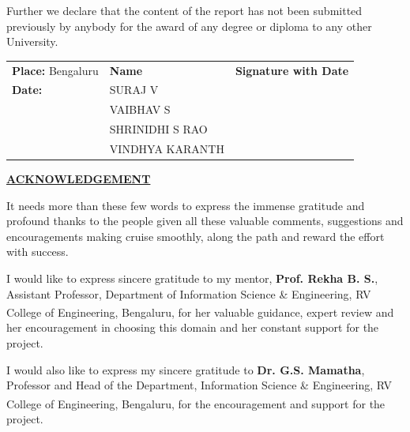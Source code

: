 \documentclass[12pt,a4paper]{report}
\begin{document}
\vspace{0.5cm}

Further we declare that the content of the report has not been submitted previously by anybody for the award of any degree or diploma to any other University.

\vfill

\begin{tabular}{@{}p{4cm}p{6cm}p{4cm}@{}}
\textbf{Place:} Bengaluru & \textbf{Name} & \textbf{Signature with Date} \\[0.5cm]
\textbf{Date:} & SURAJ V & \\[0.5cm]
& VAIBHAV S & \\[0.5cm]
& SHRINIDHI S RAO & \\[0.5cm]
& VINDHYA KARANTH & \\
\end{tabular}

\newpage
\pagestyle{frontmatter}

\begin{center}
{\Large \textbf{\underline{ACKNOWLEDGEMENT}}}
\end{center}

\vspace{1cm}

It needs more than these few words to express the immense gratitude and profound thanks to the people given all these valuable comments, suggestions and encouragements making cruise smoothly, along the path and reward the effort with success.

\vspace{0.5cm}

I would like to express sincere gratitude to my mentor, \textbf{Prof. Rekha B. S.}, Assistant Professor, Department of Information Science \& Engineering, RV College of Engineering\textsuperscript{\textregistered}, Bengaluru, for her valuable guidance, expert review and her encouragement in choosing this domain and her constant support for the project.

\vspace{0.5cm}

I would also like to express my sincere gratitude to \textbf{Dr. G.S. Mamatha}, Professor and Head of the Department, Information Science \& Engineering, RV College of Engineering\textsuperscript{\textregistered}, Bengaluru, for the encouragement and support for the project.

\vspace{0.5cm}
\end{document}
